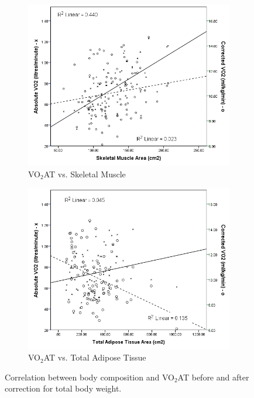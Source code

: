 \begin{figure}[htb]
	\centering
	\begin{subfigure}[b]{0.45\textwidth}
		\centering
		\includegraphics[width=\textwidth]{Figures/bc_scatter_VO2_skeletal}
		\caption{VO$_2$AT vs. Skeletal Muscle}
		\label{fig:bc_scatter_VO2_skeletal}
	\end{subfigure}
	\hfill
	\begin{subfigure}[b]{0.45\textwidth}
		\centering
		\includegraphics[width=\textwidth]{Figures/bc_scatter_VO2_TAT}
		\caption{VO$_2$AT vs. Total Adipose Tissue}
		\label{fig:bc_scatter_VO2_TAT}
	\end{subfigure}
	\caption{Correlation between body composition and VO$_2$AT before and after correction for total body weight.}	
	\label{fig:bc_scatter_VO2_bodycomp_reversal}
\end{figure}

